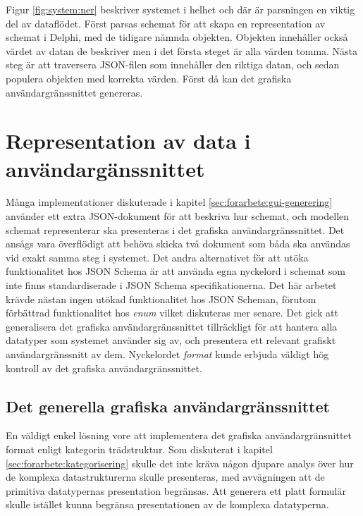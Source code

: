 \FloatBarrier

Figur \ref{fig:system:ner} beskriver systemet i helhet och där är parsningen en viktig del av dataflödet. Först parsas schemat för att skapa en representation av schemat i Delphi, med de tidigare nämnda objekten. Objekten innehåller också värdet av datan de beskriver men i det första steget är alla värden tomma. Nästa steg är att traversera JSON-filen som innehåller den riktiga datan, och sedan populera objekten med korrekta värden. Först då kan det grafiska användargränssnittet genereras.

\section{Representation av data i användargänssnittet}
\label{sec:arbetet:gui}

Många implementationer diskuterade i kapitel \ref{sec:forarbete:gui-generering} använder ett extra JSON-dokument för att beskriva hur schemat, och modellen schemat representerar ska presenteras i det grafiska användargränssnittet. Det ansågs vara överflödigt att behöva skicka två dokument som båda ska användas vid exakt samma steg i systemet. Det andra alternativet för att utöka funktionalitet hos JSON Schema är att använda egna nyckelord i schemat som inte finns standardiserade i JSON Schema specifikationerna. Det här arbetet krävde nästan ingen utökad funktionalitet hos JSON Scheman, förutom förbättrad funktionalitet hos \textit{enum} vilket diskuteras mer senare. Det gick att generalisera det grafiska användargränssnittet tillräckligt för att hantera alla datatyper som systemet använder sig av, och presentera ett relevant grafiskt användargränssnitt av dem. Nyckelordet \textit{format} kunde erbjuda väldigt hög kontroll av det grafiska användargränssnittet.

\subsection{Det generella grafiska användargränssnittet}

En väldigt enkel lösning vore att implementera det grafiska användargränsnittet format enligt kategorin trädstruktur. Som diskuterat i kapitel \ref{sec:forarbete:kategorisering} skulle det inte kräva någon djupare analys över hur de komplexa datastrukturerna skulle presenteras, med avvägningen att de primitiva datatypernas presentation begränsas. Att generera ett platt formulär skulle istället kunna begränsa presentationen av de komplexa datatyperna.

